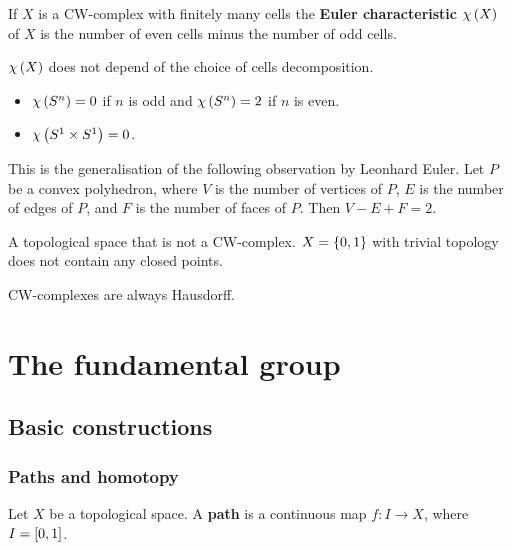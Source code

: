 \begin{definition*}
If $ X $ is a CW-complex with finitely many cells the \textbf{Euler characteristic} $ \chi\br{X} $ of $ X $ is the number of even cells minus the number of odd cells.
\end{definition*}

\begin{fact*}
$ \chi\br{X} $ does not depend of the choice of cells decomposition.
\end{fact*}

\begin{example*}
\hfill
\begin{itemize}
\item $ \chi\br{S^n} = 0 $ if $ n $ is odd and $ \chi\br{S^n} = 2 $ if $ n $ is even.
\item $ \chi\br{S^1 \times S^1} = 0 $.
\end{itemize}
\end{example*}

This is the generalisation of the following observation by Leonhard Euler. Let $ P $ be a convex polyhedron, where $ V $ is the number of vertices of $ P $, $ E $ is the number of edges of $ P $, and $ F $ is the number of faces of $ P $. Then $ V - E + F = 2 $.

\begin{example*}
A topological space that is not a CW-complex. $ X = \cbr{0, 1} $ with trivial topology does not contain any closed points.
\end{example*}

\begin{fact*}
CW-complexes are always Hausdorff.
\end{fact*}

\pagebreak

\section{The fundamental group}

\subsection{Basic constructions}

\subsubsection{Paths and homotopy}

Let $ X $ be a topological space. A \textbf{path} is a continuous map $ f : I \to X $, where $ I = \sbr{0, 1} $.

